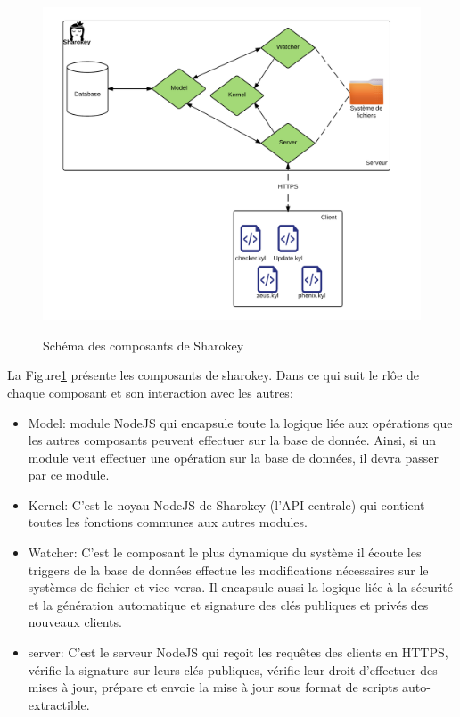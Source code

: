 \documentclass{themeensg}
\begin{document}
\begin{figure}[h!]
\centering
\includegraphics[scale=0.8]{images/composants.png}
\label{fig:composants}
\caption{Schéma des composants de Sharokey}
\end{figure}

La Figure\ref{fig:composants} présente les composants de sharokey. Dans ce qui suit le rlôe de chaque composant et son interaction avec les autres:

\begin{itemize}
\item Model: module NodeJS qui encapsule toute la logique liée aux opérations que les autres composants peuvent effectuer sur la base de donnée. Ainsi, si un module veut effectuer une opération sur la base de données, il devra passer par ce module.
\item Kernel: C'est le noyau NodeJS de Sharokey (l'API centrale) qui contient toutes les fonctions communes aux autres modules.
\item Watcher: C'est le composant le plus dynamique du système il écoute les triggers de la base de données effectue les modifications nécessaires sur le systèmes de fichier et vice-versa. Il encapsule aussi la logique liée à la sécurité et la génération automatique et signature des clés publiques et privés des nouveaux clients.
\item server: C'est le serveur NodeJS qui reçoit les requêtes des clients en HTTPS, vérifie la signature sur leurs clés publiques, vérifie leur droit d'effectuer des mises à jour, prépare et envoie la mise à jour sous format de scripts auto-extractible.
\end{itemize}
\end{document}
